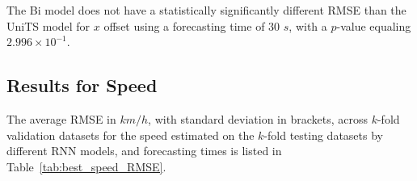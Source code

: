 \documentclass[preprint,12pt]{elsarticle}
\begin{document}
The Bi model does not have a statistically significantly different RMSE than the UniTS model for $x$ offset using a forecasting time of $30$ $s$, with a $p$-value equaling $2.996 \times 10^{-1}$.

\subsection{Results for Speed}

The average RMSE in $km/h$, with standard deviation in brackets, across $k$-fold validation datasets for the speed estimated on the $k$-fold testing datasets by different RNN models, and forecasting times is listed in Table~\ref{tab:best_speed_RMSE}.

\begin{table}[!ht]
	\centering
	\caption{The average RMSE in $km/h$, with standard deviation in brackets, across $k$-fold validation datasets for the speed estimated on the $k$-fold testing datasets by different RNN models, and forecasting times.}
	\label{tab:best_speed_RMSE}
\end{table}
\end{document}
